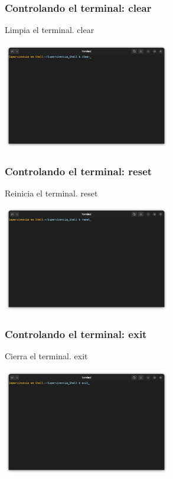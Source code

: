 \documentclass[10pt]{beamer}
\begin{document}
	\begin{frame}
		\frametitle{Controlando el terminal: clear}
		\begin{alertblock}{Limpia el terminal.}
			clear
		\end{alertblock}
		\begin{center}
			\includegraphics[width=0.55\textwidth]{clear}
		\end{center}

	\end{frame}	
	
	\begin{frame}
		\frametitle{Controlando el terminal: reset}
		\begin{alertblock}{Reinicia el terminal.}
			reset
		\end{alertblock}
		\begin{center}
			\includegraphics[width=0.55\textwidth]{reset}
		\end{center}
	\end{frame}	
	
	\begin{frame}
		\frametitle{Controlando el terminal: exit}
		\begin{alertblock}{Cierra el terminal.}
			exit
		\end{alertblock}
		\begin{center}\includegraphics[width=0.55\textwidth]{exit}
		\end{center}
	\end{frame}
\end{document}
